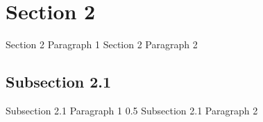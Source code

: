 \documentclass{article}%
\begin{document}
%
\newpage%
\RaggedRight%
\section{Section 2}%
\label{sec:Section2}%
Section 2 Paragraph 1%
\linebreak%
Section 2 Paragraph 2%
\linebreak%
\subsection{Subsection 2.1}%
\label{subsec:Subsection2.1}%
Subsection 2.1 Paragraph 1 0.5%
\linebreak%
Subsection 2.1 Paragraph 2%
\linebreak

%
\end{document}
